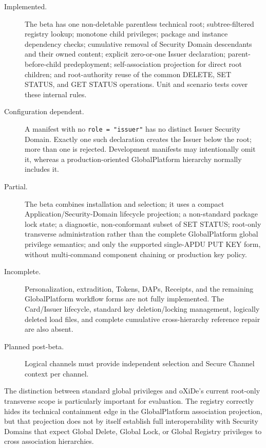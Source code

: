 \begin{description}
\item[Implemented.] The beta has one non-deletable parentless technical root;
  subtree-filtered registry lookup; monotone child privileges; package and
  instance dependency checks; cumulative removal of Security Domain
  descendants and their owned content; explicit zero-or-one Issuer declaration;
  parent-before-child predeployment; self-association projection for direct
  root children; and root-authority reuse of the common DELETE, SET STATUS, and
  GET STATUS operations. Unit and scenario tests cover these internal rules.
\item[Configuration dependent.] A manifest with no \texttt{role = "issuer"}
  has no distinct Issuer Security Domain. Exactly one such declaration creates
  the Issuer below the root; more than one is rejected. Development manifests
  may intentionally omit it, whereas a production-oriented GlobalPlatform
  hierarchy normally includes it.
\item[Partial.] The beta combines installation and selection; it uses a compact
  Application/Security-Domain lifecycle projection; a non-standard package
  lock state; a diagnostic, non-conformant subset of SET STATUS; root-only
  transverse administration rather than the complete GlobalPlatform global
  privilege semantics; and only the supported single-APDU PUT KEY form,
  without multi-command component chaining or production key policy.
\item[Incomplete.] Personalization, extradition, Tokens, DAPs, Receipts, and
  the remaining GlobalPlatform workflow forms are not fully implemented. The
  Card/Issuer lifecycle, standard key deletion/locking management, logically
  deleted load files, and complete cumulative cross-hierarchy reference repair
  are also absent.
\item[Planned post-beta.] Logical channels must provide independent selection
  and Secure Channel context per channel.
\end{description}

The distinction between standard global privileges and oXiDe's current
root-only transverse scope is particularly important for evaluation. The
registry correctly hides its technical containment edge in the GlobalPlatform
association projection, but that projection does not by itself establish full
interoperability with Security Domains that expect Global Delete, Global Lock,
or Global Registry privileges to cross association hierarchies.

